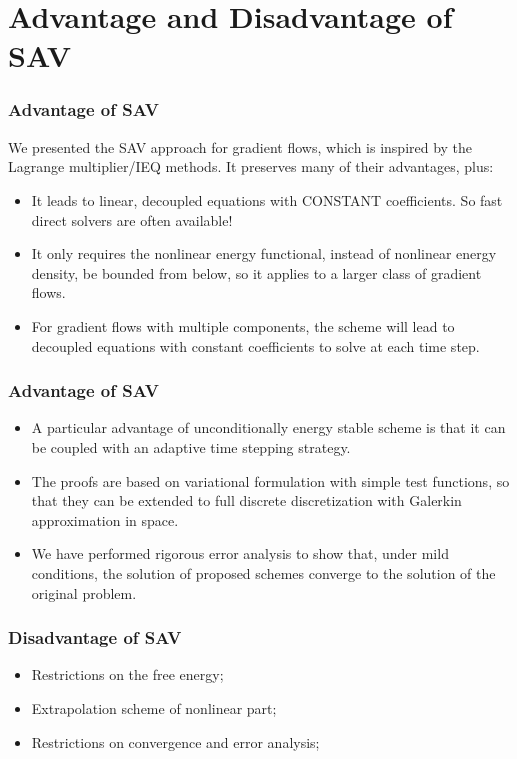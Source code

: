\documentclass{beamer}
\begin{document}
    
    
\section{Advantage and Disadvantage of SAV}
\begin{frame}
\frametitle{Advantage of SAV}
We presented the SAV approach for gradient flows, which is inspired by the Lagrange multiplier/IEQ methods. It preserves many of their advantages, plus:
\begin{itemize}
  \item It leads to linear, decoupled equations with CONSTANT coefficients. So fast direct solvers are often available!
  \item It only requires the nonlinear energy functional, instead of nonlinear energy density, be bounded from below, so it applies to a larger class of gradient flows.
  \item For gradient flows with multiple components, the scheme will lead to decoupled equations with constant coefficients to solve at each time step.
\end{itemize}
\end{frame}
\begin{frame}
\frametitle{Advantage of SAV}
\begin{itemize}
  \item A particular advantage of unconditionally energy stable scheme is that it can be coupled with an adaptive time stepping strategy.
  \item The proofs are based on variational formulation with simple test functions, so that they can be extended to full discrete discretization with Galerkin approximation in space.
  \item We have performed rigorous error analysis to show that, under mild conditions, the solution of proposed schemes converge to the solution of the original problem.
\end{itemize}
\end{frame}
    \begin{frame}
\frametitle{Disadvantage of SAV}
    \begin{itemize}
      \item Restrictions on the free energy;
      \item Extrapolation scheme of nonlinear part;
      \item Restrictions on convergence and error analysis;
    \end{itemize}


    \end{frame}
\end{document}
